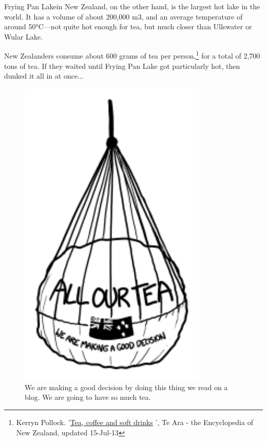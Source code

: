 {{Frying Pan Lakein New Zealand, on the other hand, is the largest hot lake in the world. It has a volume of about 200,000 m3, and an average temperature of around 50°C—not quite hot enough for tea, but much closer than Ullswater or Wular Lake.}

{New Zealanders consume about 600 grams of tea per person,{\footnote{Kerryn Pollock. '\href{http://www.teara.govt.nz/en/tea-coffee-and-soft-drinks}{Tea, coffee and soft drinks} ', Te Ara - the Encyclopedia of New Zealand, updated 15-Jul-13} } for a total of 2,700 tons of tea. If they waited until Frying Pan Lake got particularly hot, then dunked it all in at once...}

\begin{figure}[!htbp]
\centering
\includegraphics[scale=0.5, max width=0.8\textwidth]{imgs/a/79/tea_nz.png}
\caption{We are making a good decision by doing this thing we read on a blog. We are going to have so much tea.}
\end{figure}

}
